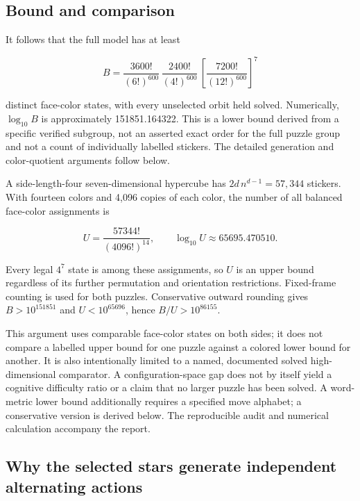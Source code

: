 \documentclass[a4paper,11pt]{article}
\begin{document}
\subsection{Bound and comparison}

It follows that the full model has at least

\begin{equation}
B=\frac{3600!}{(6!)^{600}}\,\frac{2400!}{(4!)^{600}}\,\left[\frac{7200!}{(12!)^{600}}\right]^{7}
\label{eq:lower-bound}
\end{equation}

distinct face-color states, with every unselected orbit held solved. Numerically, \(\log_{10}B\) is approximately 151851.164322. This is a lower bound derived from a specific verified subgroup, not an asserted exact order for the full puzzle group and not a count of individually labelled stickers. The detailed generation and color-quotient arguments follow below.

A side-length-four seven-dimensional hypercube has \(2d\,n^{d-1}=57{,}344\) stickers. With fourteen colors and 4,096 copies of each color, the number of all balanced face-color assignments is

\begin{equation}
U=\frac{57344!}{(4096!)^{14}},\qquad \log_{10}U\approx65695.470510.
\label{eq:upper-bound}
\end{equation}

Every legal \(4^{7}\) state is among these assignments, so \(U\) is an upper bound regardless of its further permutation and orientation restrictions. Fixed-frame counting is used for both puzzles. Conservative outward rounding gives \(B>10^{151851}\) and \(U<10^{65696}\), hence \(B/U>10^{86155}\).

This argument uses comparable face-color states on both sides; it does not compare a labelled upper bound for one puzzle against a colored lower bound for another. It is also intentionally limited to a named, documented solved high-dimensional comparator. A configuration-space gap does not by itself yield a cognitive difficulty ratio or a claim that no larger puzzle has been solved. A word-metric lower bound additionally requires a specified move alphabet; a conservative version is derived below. The reproducible audit and numerical calculation accompany the report.

\subsection{Why the selected stars generate independent alternating actions}
\end{document}
